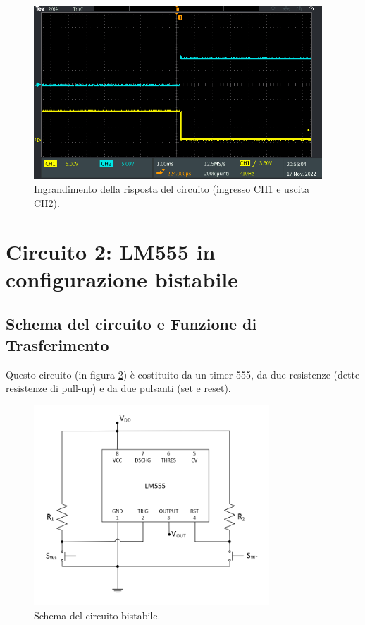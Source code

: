 \documentclass{report}
\begin{document}
\begin{figure}[h!]
	\centering
	\includegraphics[height=6.5cm]{immagini/TEK00009}
	\caption{Ingrandimento della risposta del circuito (ingresso CH1 e uscita CH2).}
	\label{figura:TEK00009}
\end{figure}

\newpage
\section{Circuito 2: LM555 in configurazione bistabile}\label{sez2}
\subsection{Schema del circuito e Funzione di Trasferimento}
Questo circuito (in figura \ref{figura:schema2}) è costituito da un timer 555, da due resistenze (dette resistenze di pull-up) e da due pulsanti (set e reset).

\begin{figure}[h!]
	\centering
	\includegraphics[height=7.5cm]{immagini/schema2}
	\caption{Schema del circuito bistabile.}
	\label{figura:schema2}
\end{figure}
\end{document}
